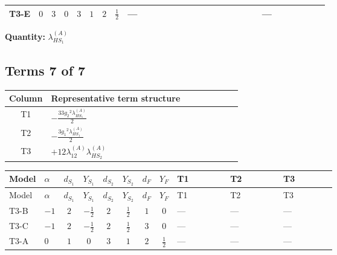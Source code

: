 \documentclass[8pt]{article}
\begin{document}
\begin{landscape}
\begin{longtable}{@{}llcccccc >{\raggedright\arraybackslash}p{0.21\linewidth} >{\raggedright\arraybackslash}p{0.21\linewidth} >{\raggedright\arraybackslash}p{0.21\linewidth}@{}}
\midrule
T3-E & $0$ & $3$ & $0$ & $3$ & $1$ & $2$ & $\frac{1}{2}$ & --- & \scriptsize\adjustbox{max width=\linewidth}{$\begin{gathered} {\lambda_{HS_1}^{(A)}} (2 T_{\nu}^{(1)}+6 \operatorname{Tr}\!\left({Y_d}\,\left({Y_d}\right)^{\dagger}\right)+2 \operatorname{Tr}\!\left({Y_e}\,\left({Y_e}\right)^{\dagger}\right)+6 \operatorname{Tr}\!\left({Y_u}\,\left({Y_u}\right)^{\dagger}\right)+16 {\lambda_{S_1}^{(A)}})\end{gathered}$} & --- \\
\midrule
\bottomrule
\end{longtable}
\clearpage
\noindent\textbf{Quantity: }$\lambda_{HS_1}^{(A)}$\par\smallskip
\subsection*{Terms 7 of 7}
\begin{center}
\begin{tabular}{@{}c >{\raggedright\arraybackslash}p{0.82\linewidth}@{}}
\toprule
Column & Representative term structure \\
\midrule
T1 & \(\displaystyle -\frac{33 {g_2}^2 {\lambda_{HS_1}^{(A)}}}{2}\) \\
\midrule
T2 & \(\displaystyle -\frac{3 {g_1}^2 {\lambda_{HS_1}^{(A)}}}{2}\) \\
\midrule
T3 & \(\displaystyle +12 {\lambda_{12}^{(A)}} {\lambda_{HS_2}^{(A)}}\) \\
\midrule
\bottomrule
\end{tabular}
\end{center}
\smallskip
\tiny
\begin{longtable}{@{}llcccccc >{\raggedright\arraybackslash}p{0.21\linewidth} >{\raggedright\arraybackslash}p{0.21\linewidth} >{\raggedright\arraybackslash}p{0.21\linewidth}@{}}
\toprule
Model & $\alpha$ & $d_{S_1}$ & $Y_{S_1}$ & $d_{S_2}$ & $Y_{S_2}$ & $d_F$ & $Y_F$ & T1 & T2 & T3 \\
\midrule
\endfirsthead
\toprule
Model & $\alpha$ & $d_{S_1}$ & $Y_{S_1}$ & $d_{S_2}$ & $Y_{S_2}$ & $d_F$ & $Y_F$ & T1 & T2 & T3 \\
\midrule
\endhead
T3-B & $-1$ & $2$ & $-\frac{1}{2}$ & $2$ & $\frac{1}{2}$ & $1$ & $0$ & --- & --- & --- \\
\midrule
T3-C & $-1$ & $2$ & $-\frac{1}{2}$ & $2$ & $\frac{1}{2}$ & $3$ & $0$ & --- & --- & --- \\
\midrule
T3-A & $0$ & $1$ & $0$ & $3$ & $1$ & $2$ & $\frac{1}{2}$ & --- & --- & --- \\

\end{longtable}
\end{landscape}
\end{document}
